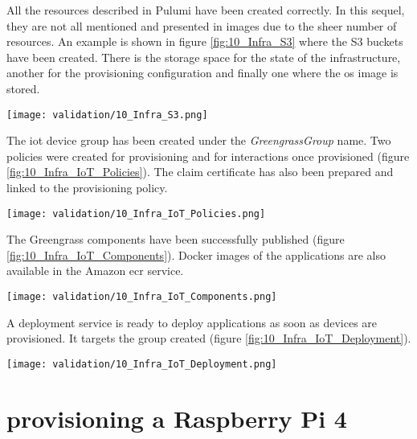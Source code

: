 All the resources described in Pulumi have been created correctly. In this sequel, they are not all mentioned and presented in images due to the sheer number of resources. An example is shown in figure \ref{fig:10_Infra_S3} where the S3 buckets have been created. There is the storage space for the state of the infrastructure, another for the provisioning configuration and finally one where the \acrshort{os} image is stored.
\begin{center}
    \begingroup
    \texttt{[image: validation/10\_Infra\_S3.png]}
    \label{fig:10_Infra_S3}
    \endgroup
\end{center}
The \acrshort{iot} device group has been created under the \textit{GreengrassGroup} name. Two policies were created for \gls{provisioning} and for interactions once provisioned (figure \ref{fig:10_Infra_IoT_Policies}). The claim certificate has also been prepared and linked to the \gls{provisioning} policy.
\begin{center}
    \begingroup
    \texttt{[image: validation/10\_Infra\_IoT\_Policies.png]}
    \label{fig:10_Infra_IoT_Policies}
    \endgroup
\end{center}
The Greengrass components have been successfully published (figure \ref{fig:10_Infra_IoT_Components}). Docker images of the applications are also available in the Amazon \acrshort{ecr} service.
\begin{center}
    \begingroup
    \texttt{[image: validation/10\_Infra\_IoT\_Components.png]}
    \label{fig:10_Infra_IoT_Components}
    \endgroup
\end{center}
A deployment service is ready to deploy applications as soon as devices are provisioned. It targets the group created (figure \ref{fig:10_Infra_IoT_Deployment}).
\begin{center}
    \begingroup
    \texttt{[image: validation/10\_Infra\_IoT\_Deployment.png]}
    \label{fig:10_Infra_IoT_Deployment}
    \endgroup
\end{center}

\section{\texorpdfstring{\Gls{provisioning}}{} a Raspberry Pi 4}

